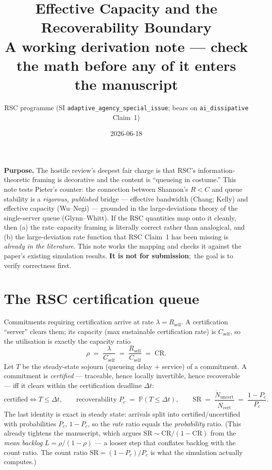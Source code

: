 \documentclass[11pt]{article}
\title{Effective Capacity and the Recoverability Boundary\\[2pt]
\large A working derivation note --- check the math before any of it enters the manuscript}
\author{RSC programme (SI \texttt{adaptive\_agency\_special\_issue}; bears on \texttt{ai\_dissipative} Claim~1)}
\date{2026-06-18}
\newcommand{\Rself}{R_{\mathrm{self}}}
\newcommand{\Cself}{C_{\mathrm{self}}}
\newcommand{\CR}{\mathrm{CR}}
\newcommand{\SR}{\mathrm{SR}}
\newcommand{\Prob}{\mathbb{P}}
\begin{document}
\maketitle

\noindent\textbf{Purpose.} The hostile review's deepest fair charge is that RSC's information-theoretic
framing is decorative and the content is ``queueing in costume.'' This note tests Pieter's
counter: the connection between Shannon's $R<C$ and queue stability is a \emph{rigorous, published}
bridge --- effective bandwidth (Chang; Kelly) and effective capacity (Wu--Negi) --- grounded in the
large-deviations theory of the single-server queue (Glynn--Whitt). If the RSC quantities map onto it
cleanly, then (a) the rate--capacity framing is literally correct rather than analogical, and (b) the
large-deviation rate function that RSC Claim~1 has been missing is \emph{already in the literature}.
This note works the mapping and checks it against the paper's existing simulation results. \textbf{It is
not for submission};\ the goal is to verify correctness first.

\section{The RSC certification queue}
Commitments requiring certification arrive at rate $\lambda=\Rself$. A certification ``server'' clears
them; its capacity (max sustainable certification rate) is $\Cself$, so the utilisation is exactly the
capacity ratio
\[
\rho \;=\; \frac{\lambda}{\Cself} \;=\; \frac{\Rself}{\Cself} \;=\; \CR .
\]
Let $T$ be the steady-state sojourn (queueing delay $+$ service) of a commitment. A commitment is
\emph{certified} --- traceable, hence locally invertible, hence recoverable --- iff it clears within the
certification deadline $\Delta t$:
\[
\text{certified} \iff T\le \Delta t,
\qquad
\text{recoverability } P_c \;=\; \Prob(T\le\Delta t),
\qquad
\SR \;=\; \frac{\dot N_{\mathrm{uncert}}}{\dot N_{\mathrm{cert}}}
      \;=\; \frac{1-P_c}{P_c}.
\]
The last identity is exact in steady state: arrivals split into certified/uncertified with probabilities
$P_c,\,1-P_c$, so the \emph{rate} ratio equals the \emph{probability} ratio. (This already tightens the
manuscript, which argues $\SR\sim \CR/(1-\CR)$ from the \emph{mean backlog} $L=\rho/(1-\rho)$ --- a looser
step that conflates backlog with the count ratio. The count ratio $\SR=(1-P_c)/P_c$ is what the
simulation actually computes.)
\end{document}
